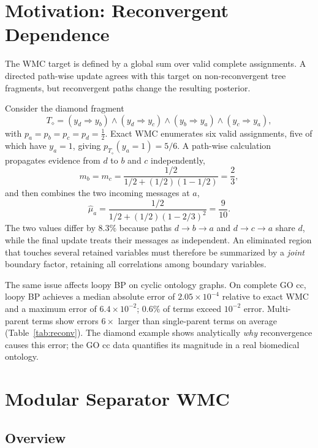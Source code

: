 \documentclass[12pt]{article}
\begin{document}
\section{Motivation: Reconvergent Dependence}
\label{sec:local-reconvergence}

The WMC target is defined by a global sum over valid complete
assignments. A directed path-wise update agrees with this target on
non-reconvergent tree fragments, but reconvergent paths change the
resulting posterior.

Consider the diamond fragment
\[
  T_{\diamond}
  = (y_d \Rightarrow y_b) \wedge (y_d \Rightarrow y_c)
    \wedge (y_b \Rightarrow y_a) \wedge (y_c \Rightarrow y_a),
\]
with $p_a = p_b = p_c = p_d = \tfrac{1}{2}$. Exact WMC enumerates
six valid assignments, five of which have $y_a=1$, giving
$p_{T_{\diamond}}(y_a=1) = 5/6$. A path-wise calculation propagates
evidence from $d$ to $b$ and $c$ independently,
\[
  m_b = m_c = \frac{1/2}{1/2+(1/2)(1-1/2)} = \frac{2}{3},
\]
and then combines the two incoming messages at $a$,
\[
  \widehat{\mu}_a
  = \frac{1/2}{1/2+(1/2)(1-2/3)^2} = \frac{9}{10}.
\]
The two values differ by $8.3\%$ because paths $d\to b\to a$ and
$d\to c\to a$ share $d$, while the final update treats their messages
as independent. An eliminated region that touches several retained
variables must therefore be summarized by a \emph{joint} boundary
factor, retaining all correlations among boundary variables.

The same issue affects loopy BP on cyclic ontology graphs. On complete
GO cc, loopy BP achieves a median absolute error of
$2.05\times10^{-4}$ relative to exact WMC and a maximum error of
$6.4\times10^{-2}$; $0.6\%$ of terms exceed $10^{-2}$ error.
Multi-parent terms show errors $6\times$ larger than single-parent
terms on average (Table~\ref{tab:reconv}). The diamond example shows
analytically \emph{why} reconvergence causes this error; the GO cc
data quantifies its magnitude in a real biomedical ontology.

\section{Modular Separator WMC}
\label{sec:method}

\subsection{Overview}
\end{document}
